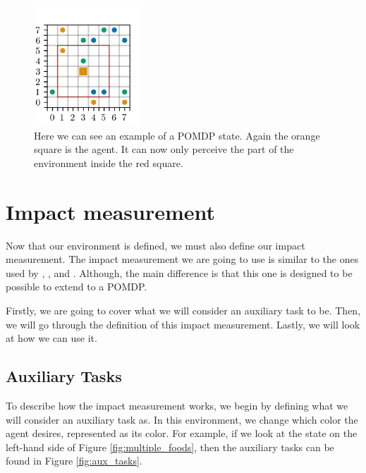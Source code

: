 \documentclass[12pt,A4]{report}
\theoremstyle{definition}
\begin{document}
\begin{figure}[H]
  \centering
  \includegraphics[width=4cm]{"./figures/redline.png"}
  \caption{Here we can see an example of a POMDP state. Again the orange square is the agent. It can now only perceive the part of the environment inside the red square.}
  \label{fig:redline}
\end{figure}


\section{Impact measurement}
Now that our environment is defined, we must also define our impact measurement. The impact measurement we are going to use is similar to the ones used by \citet{Turner19}, \citet{Krakovna19}, and \citet{Krakovna20}. Although, the main difference is that this one is designed to be possible to extend to a POMDP.

Firstly, we are going to cover what we will consider an auxiliary task to be. Then, we will go through the definition of this impact measurement. Lastly, we will look at how we can use it. 

\subsection{Auxiliary Tasks}
To describe how the impact measurement works, we begin by defining what we will consider an auxiliary task as. In this environment, we change which color the agent desires, represented as its color. For example, if we look at the state on the left-hand side of Figure \ref{fig:multiple_foods}, then the auxiliary tasks can be found in Figure \ref{fig:aux_tasks}.
\end{document}
